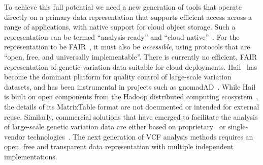 \documentclass[a4paper,num-refs]{oup-contemporary}
\begin{document}
To achieve this full potential we
need a new generation of tools that operate directly
on a primary data representation that supports
efficient access across a range of applications,
with native support for cloud object storage.
Such a representation can be termed ``analysis-ready''
and ``cloud-native''~\citep{abernathey2021cloud}.
For the representation to be FAIR~\citep{wilkinson2016fair},
it must also be \emph{accessible}, using protocols that are
``open, free, and universally implementable''.
There is currently no efficient, FAIR representation of genetic variation
data suitable for cloud deployments.
Hail~\cite{ganna2016ultra,hail2024} has become the dominant platform
for quality control of large-scale variation datasets,
and has been instrumental in projects such as
gnomadAD~\cite{karczewski2020mutational,chen2024genomic}.
While Hail is built on open components
from the Hadoop distributed computing ecosystem~\citep{white2012hadoop},
the details of its MatrixTable format are not documented
or intended for external reuse.
Similarly, commercial solutions that have emerged to facilitate
the analysis of large-scale genetic variation data are either
based on proprietary~\cite{basespace2024,graf2024,googlelifesciences2024,
awshealthomics2024,microsoftgenomics2024}
or single-vendor technologies~\cite[e.g.][]{tiledb2024,genomicsdb2024}.
The next generation of VCF analysis methods requires
an open, free and transparent data representation
with multiple independent implementations.
\end{document}

